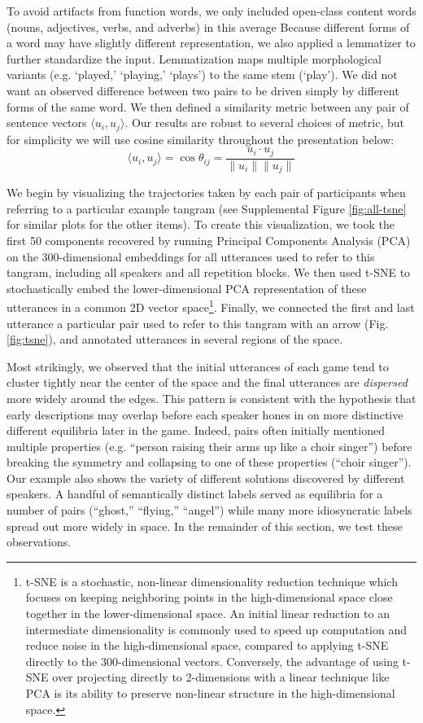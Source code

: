 \documentclass[alpha-refs]{wiley-article}
\begin{document}
To avoid artifacts from function words, we only included open-class content words (nouns, adjectives, verbs, and adverbs) in this average
Because different forms of a word may have slightly different representation, we also applied a lemmatizer to further standardize the input. Lemmatization maps multiple morphological variants (e.g. `played,' `playing,' `plays') to the same stem (`play'). 
We did not want an observed difference between two pairs to be driven simply by different forms of the same word.
We then defined a similarity metric between any pair of sentence vectors $\langle u_i, u_j \rangle$.
Our results are robust to several choices of metric, but for simplicity we will use cosine similarity throughout the presentation below: $$\langle u_i, u_j \rangle = \cos \theta_{ij} = \frac{u_i \cdot u_j}{\| u_i\| \| u_j \|}$$

We begin by visualizing the trajectories taken by each pair of participants when referring to a particular example tangram (see Supplemental Figure \ref{fig:all-tsne} for similar plots for the other items).
To create this visualization, we took the first 50 components recovered by running Principal Components Analysis (PCA) on the 300-dimensional embeddings for all utterances used to refer to this tangram, including all speakers and all repetition blocks.
We then used t-SNE \citep{maaten2008visualizing} to stochastically embed the lower-dimensional PCA representation of these utterances in a common 2D vector space\footnote{t-SNE is a stochastic, non-linear dimensionality reduction technique which focuses on keeping neighboring points in the high-dimensional space close together in the lower-dimensional space. An initial linear reduction to an intermediate dimensionality is commonly used to speed up computation and reduce noise in the high-dimensional space, compared to applying t-SNE directly to the 300-dimensional vectors. Conversely, the advantage of using t-SNE over projecting directly to 2-dimensions with a linear technique like PCA is its ability to preserve non-linear structure in the high-dimensional space.}.
Finally, we connected the first and last utterance a particular pair used to refer to this tangram with an arrow (Fig. \ref{fig:tsne}), and annotated utterances in several regions of the space.

Most strikingly, we observed that the initial utterances of each game tend to cluster tightly near the center of the space and the final utterances are \emph{dispersed} more widely around the edges.
This pattern is consistent with the hypothesis that early descriptions may overlap before each speaker hones in on more distinctive different equilibria later in the game.
Indeed, pairs often initially mentioned multiple properties (e.g. ``person raising their arms up like a choir singer'') before breaking the symmetry and collapsing to one of these properties (``choir singer'').
Our example also shows the variety of different solutions discovered by different speakers.
A handful of semantically distinct labels served as equilibria for a number of pairs (``ghost,'' ``flying,'' ``angel'') while many more idiosyncratic labels spread out more widely in space.
In the remainder of this section, we test these observations.
\end{document}
